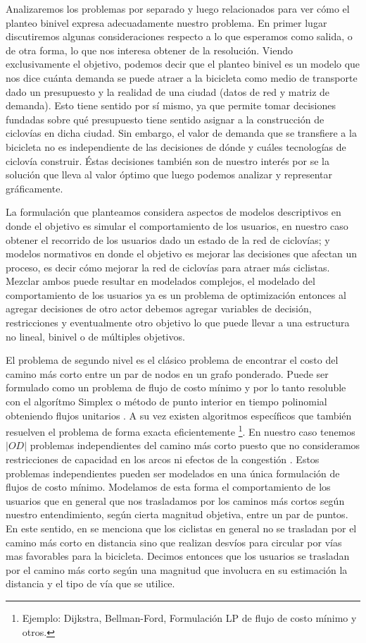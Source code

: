 \documentclass{article}
\begin{document}
  Analizaremos los problemas por separado y luego relacionados para ver cómo el planteo binivel expresa adecuadamente nuestro problema. En primer lugar discutiremos algunas consideraciones respecto a lo que esperamos como salida, o de otra forma, lo que nos interesa obtener de la resolución. Viendo exclusivamente el objetivo, podemos decir que el planteo binivel es un modelo que nos dice cuánta demanda se puede atraer a la bicicleta como medio de transporte dado un presupuesto y la realidad de una ciudad (datos de red y matriz de demanda). Esto tiene sentido por sí mismo, ya que permite tomar decisiones fundadas sobre qué presupuesto tiene sentido asignar a la construcción de ciclovías en dicha ciudad. Sin embargo, el valor de demanda que se transfiere a la bicicleta no es independiente de las decisiones de dónde y cuáles tecnologías de ciclovía construir. Éstas decisiones también son de nuestro interés por se la solución que lleva al valor óptimo que luego podemos analizar y representar gráficamente.

  La formulación que planteamos considera aspectos de modelos descriptivos en donde el objetivo es simular el comportamiento de los usuarios, en nuestro caso obtener el recorrido de los usuarios dado un estado de la red de ciclovías; y modelos normativos en donde el objetivo es mejorar las decisiones que afectan un proceso, es decir cómo mejorar la red de ciclovías para atraer más ciclistas. Mezclar ambos puede resultar en modelados complejos, el modelado del comportamiento de los usuarios ya es un problema de optimización entonces al agregar decisiones de otro actor debemos agregar variables de decisión, restricciones y eventualmente otro objetivo lo que puede llevar a una estructura no lineal, binivel o de múltiples objetivos.

  El problema de segundo nivel es el clásico problema de encontrar el costo del camino más corto entre un par de nodos en un grafo ponderado. Puede ser formulado como un problema de flujo de costo mínimo y por lo tanto resoluble con el algorítmo Simplex o método de punto interior en tiempo polinomial obteniendo flujos unitarios \cite{networkflowsbook}. A su vez existen algoritmos específicos que también resuelven el problema de forma exacta eficientemente \footnote{Ejemplo: Dijkstra, Bellman-Ford, Formulación LP de flujo de costo mínimo y otros.}. En nuestro caso tenemos $|OD|$ problemas independientes del camino más corto puesto que no consideramos restricciones de capacidad en los arcos ni efectos de la congestión \cite{Sheffi1985}. Estos problemas independientes pueden ser modelados en una única formulación de flujos de costo mínimo. Modelamos de esta forma el comportamiento de los usuarios que en general que nos trasladamos por los caminos más cortos según nuestro entendimiento, según cierta magnitud objetiva, entre un par de puntos. En este sentido, en \cite{winters2010} se menciona que los ciclistas en general no se trasladan por el camino más corto en distancia sino que realizan desvíos para circular por vías mas favorables para la bicicleta. Decimos entonces que los usuarios se trasladan por el camino más corto según una magnitud que involucra en su estimación la distancia y el tipo de vía que se utilice.
\end{document}
